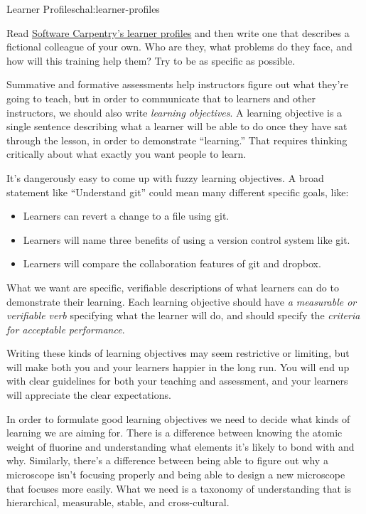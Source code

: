 \begin{challenge}{Learner Profiles}{chal:learner-profiles}

Read \href{http://software-carpentry.org/audience/}{Software Carpentry's
learner profiles} and then write one that describes a fictional
colleague of your own. Who are they, what problems do they face, and how
will this training help them? Try to be as specific as possible.
\end{challenge}


Summative and formative assessments help instructors figure out what
they're going to teach, but in order to communicate that to learners and
other instructors, we should also write \emph{learning objectives}. A
learning objective is a single sentence describing what a learner will
be able to do once they have sat through the lesson, in order to
demonstrate ``learning.'' That requires thinking critically about what
exactly you want people to learn.

It's dangerously easy to come up with fuzzy learning objectives. A broad
statement like ``Understand git'' could mean many different specific
goals, like:

\begin{itemize}
\item
  Learners can revert a change to a file using git.
\item
  Learners will name three benefits of using a version control system
  like git.
\item
  Learners will compare the collaboration features of git and dropbox.
\end{itemize}

What we want are specific, verifiable descriptions of what learners can
do to demonstrate their learning. Each learning objective should have
\emph{a measurable or verifiable verb} specifying what the learner will
do, and should specify the \emph{criteria for acceptable performance}.

Writing these kinds of learning objectives may seem restrictive or
limiting, but will make both you and your learners happier in the long
run. You will end up with clear guidelines for both your teaching and
assessment, and your learners will appreciate the clear expectations.

In order to formulate good learning objectives we need to decide what
kinds of learning we are aiming for. There is a difference between
knowing the atomic weight of fluorine and understanding what elements
it's likely to bond with and why. Similarly, there's a difference
between being able to figure out why a microscope isn't focusing
properly and being able to design a new microscope that focuses more
easily. What we need is a taxonomy of understanding that is
hierarchical, measurable, stable, and cross-cultural.

